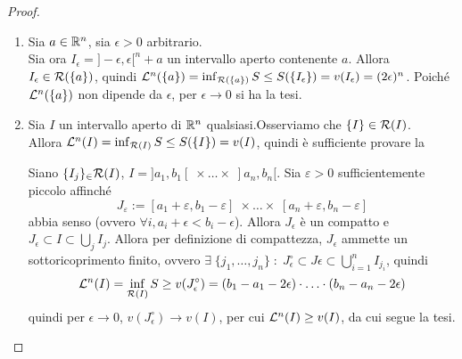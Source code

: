 \begin{proof}~
  \begin{enumerate}[label=$(\arabic*)$] 
      \item Sia $a\in \mathbb{R}^n$, sia $\epsilon>0$ arbitrario. \hspace{\fill}\\ 
      Sia ora $I_\epsilon = ]-\epsilon, \epsilon[^n+a$ un intervallo aperto contenente $a$. Allora $I_\epsilon\in \mathcal{R}(\{a\})$, quindi $\mathcal{L}^n(\{a\}) = \inf_{\mathcal{R}(\{a\})}S\leq S(\{I_\epsilon\})=v(I_\epsilon)=(2\epsilon)^n$. Poiché $\mathcal{L}^n(\{a\})$ non dipende da $\epsilon$, per $\epsilon\to 0$ si ha la tesi.
      \item Sia $I$ un intervallo aperto di $\mathbb{R}^n$ qualsiasi.Osserviamo che $\{I\}\in \mathcal{R}(I)$. \hspace{\fill}\\
      Allora $\mathcal{L}^n(I)=\inf_{\mathcal{R}(I)}S\leq S(\{I\})=v(I)$, quindi è sufficiente provare la 

      Siano $\{I_j\}_\in \mathcal{R}(I)$, $I=]a_1,b_1[\;\times\dots\times\;]a_n,b_n[$. Sia $\varepsilon>0$ sufficientemente piccolo affinché 
      \[J_\varepsilon := [a_1+\varepsilon,b_1-\varepsilon]\;\times\dots\times\;[a_n+\varepsilon,b_n-\varepsilon]\]
      abbia senso (ovvero $\forall i, a_i+\epsilon <b_i-\epsilon$). Allora $J_\epsilon$ è un compatto e $J_\epsilon\subset I\subset \bigcup_jI_j$. Allora per definizione di compattezza, $J_\epsilon$ ammette un sottoricoprimento finito, ovvero $\exists\;\{j_1, \dots, j_n\}\;:\; J_\epsilon^\circ\subset J\epsilon\subset \bigcup_{i=1}^nI_{j_i}$, quindi 
      \[\mathcal{L}^n(I) = \inf_{\mathcal{R}(I)}S\geq v(J_\epsilon^\circ)=(b_1-a_1-2\epsilon)\cdot \ldots\cdot (b_n-a_n-2\epsilon)\]
      quindi per $\epsilon \to 0$, $v(J_\epsilon^\circ)\to v(I)$, per cui $\mathcal{L}^n(I)\geq v(I)$, da cui segue la tesi.


\end{enumerate}
\end{proof}
